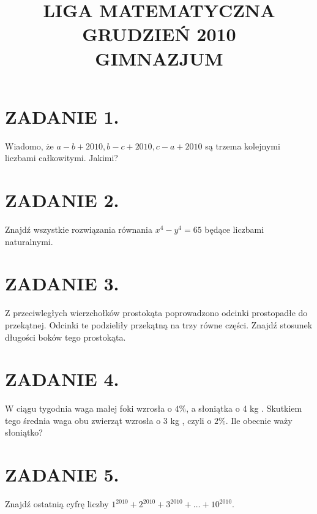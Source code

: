 \documentclass[10pt]{article}
\title{LIGA MATEMATYCZNA \\
 GRUDZIEŃ 2010 \\
 GIMNAZJUM }
\author{}
\date{}
\begin{document}
\maketitle
\section*{ZADANIE 1.}
Wiadomo, że \(a-b+2010, b-c+2010, c-a+2010\) są trzema kolejnymi liczbami całkowitymi. Jakimi?

\section*{ZADANIE 2.}
Znajdź wszystkie rozwiązania równania \(x^{4}-y^{4}=65\) będące liczbami naturalnymi.

\section*{ZADANIE 3.}
Z przeciwległych wierzchołków prostokąta poprowadzono odcinki prostopadłe do przekątnej. Odcinki te podzieliły przekątną na trzy równe części. Znajdź stosunek długości boków tego prostokąta.

\section*{ZADANIE 4.}
W ciągu tygodnia waga małej foki wzrosła o \(4 \%\), a słoniątka o 4 kg . Skutkiem tego średnia waga obu zwierząt wzrosła o 3 kg , czyli o \(2 \%\). Ile obecnie waży słoniątko?

\section*{ZADANIE 5.}
Znajdź ostatnią cyfrę liczby \(1^{2010}+2^{2010}+3^{2010}+\ldots+10^{2010}\).
\end{document}
